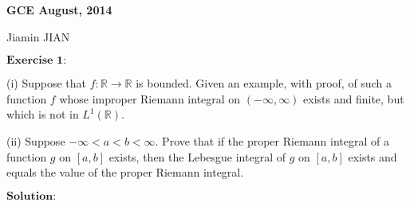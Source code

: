 \documentclass[12pt,a4paper]{ctexart}
\begin{document}
\begin{center}
\textbf{ GCE August, 2014}
\vspace{8pt}

Jiamin JIAN
\end{center}

\vspace{12pt}

$\textbf{Exercise 1:}$

(i) Suppose that $f: \mathbb{R} \to \mathbb{R}$ is bounded. Given an example, with proof, of such a function $f$ whose improper Riemann integral on $(-\infty, \infty)$ exists and finite, but which is not in $L^{1}(\mathbb{R})$.

\vspace{4pt}

(ii) Suppose $- \infty < a < b < \infty$. Prove that if the proper Riemann integral of a function $g$ on $[a, b]$ exists, then the Lebesgue integral of $g$ on $[a, b]$ exists and equals the value of the proper Riemann integral.

\vspace{8pt}

$\textbf{Solution:}$
\end{document}
